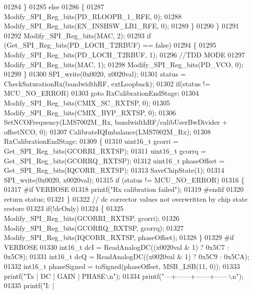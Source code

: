 \begin{DoxyCode}
{{{{{{{{{{{{{{{{{{{{{{{{{{{{01284         \}
01285         \textcolor{keywordflow}{else}
01286         \{
01287             Modify_SPI_Reg_bits(PD_RLOOPB_1_RFE, 0);
01288             Modify_SPI_Reg_bits(EN_INSHSW_LB1_RFE, 0);
01289         \}
01290     \}
01291 
01292     Modify_SPI_Reg_bits(MAC, 2);
01293     \textcolor{keywordflow}{if} (Get_SPI_Reg_bits(PD_LOCH_T2RBUF) == \textcolor{keyword}{false})
01294     \{
01295         Modify_SPI_Reg_bits(PD_LOCH_T2RBUF, 1);
01296         \textcolor{comment}{//TDD MODE}
01297         Modify_SPI_Reg_bits(MAC, 1);
01298         Modify_SPI_Reg_bits(PD_VCO, 0);
01299     \}
01300     SPI_write(0x0020, x0020val);
01301     status = CheckSaturationRx(bandwidthRF, extLoopback);
01302     \textcolor{keywordflow}{if}(status != MCU_NO_ERROR)
01303         \textcolor{keywordflow}{goto} RxCalibrationEndStage;
01304     Modify_SPI_Reg_bits(CMIX_SC_RXTSP, 0);
01305     Modify_SPI_Reg_bits(CMIX_BYP_RXTSP, 0);
01306     SetNCOFrequency(LMS7002M_Rx, bandwidthRF/calibUserBwDivider + offsetNCO, 0);
01307     CalibrateIQImbalance(LMS7002M_Rx);
01308 RxCalibrationEndStage:
01309     \{
01310         uint16\_t gcorri = Get_SPI_Reg_bits(GCORRI_RXTSP);
01311         uint16\_t gcorrq = Get_SPI_Reg_bits(GCORRQ_RXTSP);
01312         uint16\_t phaseOffset = Get_SPI_Reg_bits(IQCORR_RXTSP);
01313         SaveChipState(1);
01314         SPI_write(0x0020, x0020val);
01315         \textcolor{keywordflow}{if} (status != MCU_NO_ERROR)
01316         \{
01317 \textcolor{preprocessor}{#if VERBOSE}
01318             printf(\textcolor{stringliteral}{"Rx calibration failed"});
01319 \textcolor{preprocessor}{#endif}
01320             \textcolor{keywordflow}{return} status;
01321         \}
01322         \textcolor{comment}{// dc corrector values not overwritten by chip state restore}
01323         \textcolor{keywordflow}{if}(!dcOnly)
01324         \{
01325             Modify_SPI_Reg_bits(GCORRI_RXTSP, gcorri);
01326             Modify_SPI_Reg_bits(GCORRQ_RXTSP, gcorrq);
01327             Modify_SPI_Reg_bits(IQCORR_RXTSP, phaseOffset);
01328         \}
01329 \textcolor{preprocessor}{#if VERBOSE}
01330         int16\_t dcI = ReadAnalogDC((x0020val & 1) ? 0x5C7 : 0x5C8);
01331         int16\_t dcQ = ReadAnalogDC((x0020val & 1) ? 0x5C9 : 0x5CA);
01332         int16\_t phaseSigned = toSigned(phaseOffset, MSB_LSB(11, 0));
01333         printf(\textcolor{stringliteral}{"Tx | DC   | GAIN | PHASE\(\backslash\)n"});
01334         printf(\textcolor{stringliteral}{"---+------+------+------\(\backslash\)n"});
01335         printf(\textcolor{stringliteral}{"I: | %
}}}}}}}}}}}}}}}}}}}}}}}}}}}}}
\end{DoxyCode}
